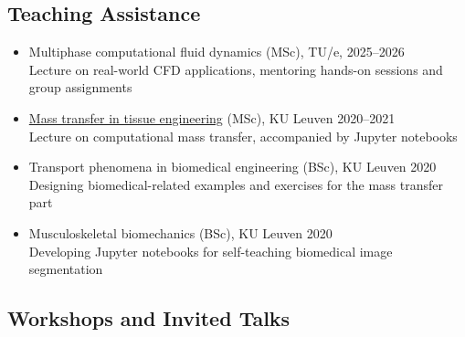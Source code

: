 \documentclass{cv}
\begin{document}
\subsection{Teaching Assistance}


\begin{itemize}[itemsep=-0.2ex]
\item
Multiphase computational fluid dynamics (MSc), TU/e, \hfill 2025--2026\\
Lecture on real-world CFD applications, mentoring hands-on sessions and group assignments 
\item 
\href{https://github.com/mbarzegary/mass-transport-tissue-engineering-fall2021}{Mass transfer in tissue engineering} (MSc), KU Leuven \hfill 2020--2021
\\
Lecture on computational mass transfer, accompanied by Jupyter notebooks 
\item 
Transport phenomena in biomedical engineering (BSc), KU Leuven \hfill 2020
\\
Designing biomedical-related examples and exercises for the mass transfer part
\item 
Musculoskeletal biomechanics (BSc), KU Leuven \hfill 2020
\\
Developing Jupyter notebooks for self-teaching biomedical image segmentation 
\end{itemize}

\subsection{Workshops and Invited Talks}
\end{document}
